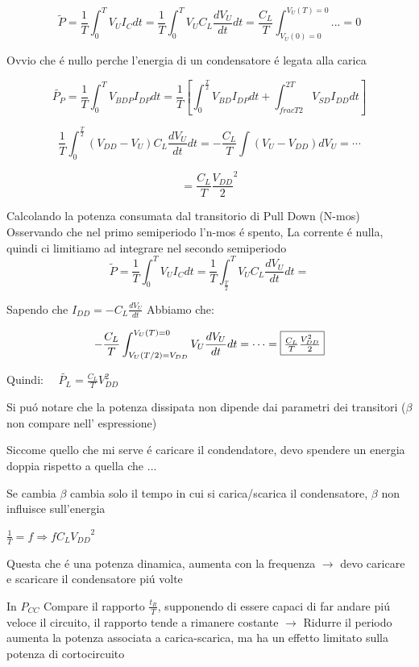 \documentclass{article}
\begin{document}
\[
    \tilde{P} = \frac{1}{T}\int_0^T  V_U I_C dt = \frac{1}{T} \int_0^T V_U C_L \frac{dV_U}{dt} dt =
    \frac{C_L}{T}\int_{V_U(0)=0}^{V_U(T) = 0} ... = 0
\]

Ovvio che \'e nullo perche l'energia di un condensatore \'e legata alla carica

\[
    \tilde{P_P} = \frac{1}{T} \int_0^T V_{BDP} I_{DP} dt = \frac{1}{T}\left[ \int_0^{\frac{T}{2}} V_{BD} I_{DP} dt + \int_{frac{T}{2}}^{2T} V_{SD}I_{DD}dt\right]
\]


\[
    \frac{1}{T} \int_0^{\frac{T}{2}} (V_{DD} - V_U) C_L \frac{dV_U}{dt}dt = -\frac{C_L}{T} \int (V_U - V_{DD}) dV_U = \cdots
\]

\[
    =\frac{C_L}{T} \frac{V_{DD}}{2}^2
\]

Calcolando la potenza consumata dal transitorio di Pull Down (N-mos)
Osservando che nel primo semiperiodo l'n-mos \'e spento, La corrente \'e nulla, quindi ci limitiamo ad integrare nel secondo semiperiodo
\[
    \tilde{P} = \frac{1}{T}\int_0^T  V_U I_C dt = \frac{1}{T} \int_{\frac{T}{2}}^T V_U C_L \frac{dV_U}{dt} dt =
\]

Sapendo che $I_{DD} = -C_L\frac{dV_U}{dt}$ Abbiamo che:

\[
    -\frac{C_L}{T} \int_{V_U(T/2) = V_{DD}} ^ {V_U(T) = 0} V_U \frac{dV_U}{dt} dt = \cdots = \framebox{$\frac{C_L}{T} \frac{V_{DD}^2}{2}$}
\]

Quindi: $\quad \tilde{P_L} = \frac{C_L}{T} {V_{DD}^2} $

Si pu\'o notare che la potenza dissipata non dipende dai parametri dei transitori ($\beta$ non compare nell' espressione)

Siccome quello che mi serve \'e caricare il condendatore, devo spendere un energia doppia rispetto a quella che ...

Se cambia $\beta$ cambia solo il tempo in cui si carica/scarica il condensatore, $\beta$ non influisce sull'energia

$ \frac{1}{T} = f  \Rightarrow  f C_L {V_{DD}}^2$

Questa che \'e una potenza dinamica, aumenta con la frequenza $\rightarrow$ devo caricare e scaricare il condensatore pi\'u volte

In $P_{CC}$ Compare il rapporto  $\frac{t_R}{T}$, supponendo di essere capaci di far andare pi\'u veloce il circuito, il rapporto tende a rimanere costante $\rightarrow$ Ridurre il periodo aumenta la potenza associata a carica-scarica, ma ha un effetto limitato sulla potenza di cortocircuito
\end{document}
